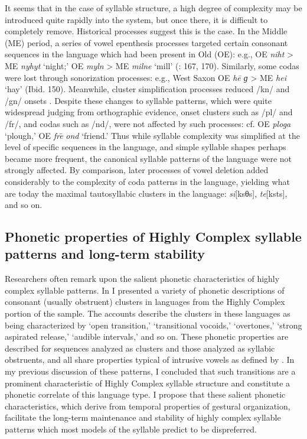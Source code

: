   It seems that in the case of syllable structure, a high degree of complexity may be introduced quite rapidly into the system, but once there, it is difficult to completely remove. Historical processes suggest this is the case. In the Middle  (ME) period, a series of vowel epenthesis processes targeted certain consonant sequences in the language which had been present in Old  (OE): e.g., OE \textit{niht} > ME \textit{nyhyt} ‘night;’ OE \textit{myln} > ME \textit{milne} ‘mill’ (\citealt{Jones1989}: 167, 170). Similarly, some codas were lost through sonorization processes: e.g., West Saxon OE \textit{he\={} ɡ} > ME \textit{hei} ‘hay’ (Ibid. 150). Meanwhile, cluster simplification processes reduced /kn/ and /gn/ onsets \citep{Minkova2003}. Despite these changes to syllable patterns, which were quite widespread judging from orthographic evidence, onset clusters such as /pl/ and /fr/, and codas such as /nd/, were not affected by such processes: cf. OE \textit{ploga} ‘plough,’ OE \textit{fre}\textsf{\={} }\textit{ond} ‘friend.’ Thus while syllable complexity was simplified at the level of specific sequences in the language, and simple syllable shapes perhaps became more frequent, the canonical syllable patterns of the language were not strongly affected. By comparison, later processes of vowel deletion added considerably to the complexity of coda patterns in the language, yielding what are today the maximal tautosyllabic clusters in the language: \textit{si}[ksθs], \textit{te}[ksts], and so on.

\subsection{Phonetic properties of Highly Complex syllable patterns and long-term stability}\label{sec:8.5.3}

  Researchers often remark upon the salient phonetic characteristics of highly complex syllable patterns. In  I presented a variety of phonetic descriptions of consonant (usually obstruent) clusters in languages from the Highly Complex portion of the sample. The accounts describe the clusters in these languages as being characterized by ‘open transition,’ ‘transitional vocoids,’ ‘overtones,’ ‘strong aspirated release,’ ‘audible intervals,’ and so on. These phonetic properties are described for sequences analyzed as clusters and those analyzed as syllabic obstruents, and all share properties typical of intrusive vowels as defined by \citet{Hall2006}. In my previous discussion of these patterns, I concluded that such transitions are a prominent characteristic of Highly Complex syllable structure and constitute a phonetic correlate of this language type. I propose that these salient phonetic characteristics, which derive from temporal properties of gestural organization, facilitate the long-term maintenance and stability of highly complex syllable patterns which most models of the syllable predict to be dispreferred.

